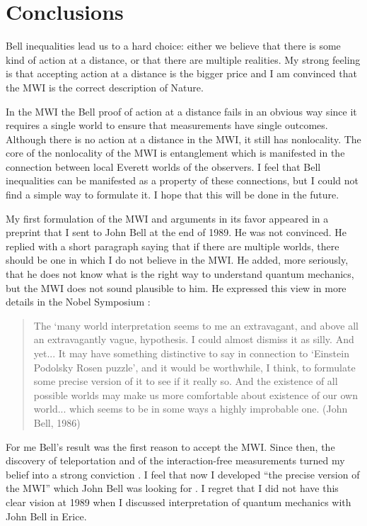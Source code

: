 \documentclass[11pt]{article}
\begin{document}
\section{Conclusions}

Bell inequalities lead us to a hard choice: either we believe that there is some kind of action at a distance, or that there are multiple realities. My strong feeling is that accepting action at a distance is the bigger price and I am convinced that the MWI is the correct description of Nature.

In the MWI  the Bell proof of action at a distance fails in an obvious way since it requires a single world to ensure that measurements have single outcomes. Although there is no action at a distance in the MWI, it still has nonlocality.
The core of the nonlocality of the MWI is entanglement which is manifested in the connection between local Everett worlds of the observers. I feel that Bell inequalities can be manifested as a property of these connections, but I could not find a simple way to formulate it. I hope that this will be done in the future.

My first formulation of the MWI and arguments in its favor appeared in a preprint \cite{schizo} that I sent to John Bell at the end of 1989. He was not convinced. He replied with a short paragraph saying that if there are multiple worlds, there should be one in which I do not believe in the MWI. He added, more seriously, that he does not know what is the right way to understand quantum mechanics, but the MWI does not sound plausible to him. He expressed this view  in more details in the Nobel Symposium  \cite{Bell86}:
  \begin{quote}
 The `many world interpretation seems to me an extravagant, and above all an extravagantly vague, hypothesis. I could almost dismiss it as silly. And yet... It may have something distinctive to say in connection to `Einstein Podolsky Rosen puzzle', and it would be worthwhile, I think, to formulate some precise version of it to see if it really so. And the existence of all possible worlds may make us more comfortable about existence of our own world... which seems to be in some ways a highly improbable one.\flushright
(John Bell, 1986)
\end{quote}

For me Bell's result  was the first   reason to accept the MWI. Since then, the discovery of  teleportation and of the interaction-free measurements turned my belief into a strong conviction \cite{PSA}. I feel that now I developed ``the precise version of the MWI'' which John Bell was looking for \cite{qmdet}. I regret that I did not have this clear vision at 1989 when I discussed interpretation of quantum mechanics with John Bell in Erice.
\end{document}
